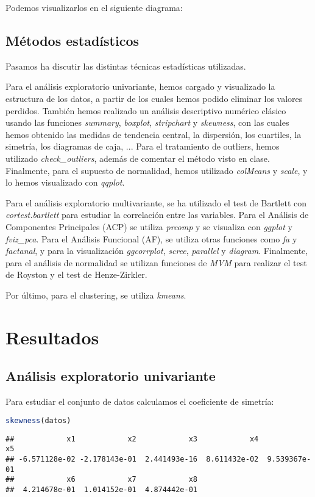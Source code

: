 \documentclass[11pt,a4paper]{article}
\begin{document}
Podemos visualizarlos en el siguiente diagrama:
\begin{figure}[H]
\centering
{}
\end{figure}

\subsection{Métodos estadísticos}
Pasamos ha discutir las distintas técnicas estadísticas utilizadas.

Para el análisis exploratorio univariante, hemos cargado y visualizado la estructura de los datos, a partir de los cuales hemos podido eliminar los valores perdidos. También hemos realizado un análisis descriptivo numérico clásico usando las funciones \emph{summary}, \emph{boxplot}, \emph{stripchart} y \emph{skewness}, con las cuales hemos obtenido las medidas de tendencia central, la dispersión, los cuartiles, la simetría, los diagramas de caja, ... Para el tratamiento de outliers, hemos utilizado \emph{check\_outliers}, además de comentar el método visto en clase. Finalmente, para el supuesto de normalidad, hemos utilizado \emph{colMeans} y \emph{scale}, y lo hemos visualizado con \emph{qqplot}.

Para el análisis exploratorio multivariante, se ha utilizado el test de Bartlett con \emph{cortest.bartlett} para estudiar la correlación entre las variables. Para el Análisis de Componentes Principales (ACP) se utiliza \emph{prcomp} y se visualiza con \emph{ggplot} y \emph{fviz\_pca}. Para el Análisis Funcional (AF), se utiliza otras funciones como \emph{fa} y \emph{factanal}, y para la visualización \emph{ggcorrplot}, \emph{scree}, \emph{parallel} y \emph{diagram}. Finalmente, para el análisis de normalidad se utilizan funciones de \emph{MVM} para realizar el test de Royston y el test de Henze-Zirkler.

Por último, para el clustering, se utiliza \emph{kmeans}.

\section{Resultados}
\subsection{Análisis exploratorio univariante}
Para estudiar el conjunto de datos calculamos el coeficiente de simetría:
\begin{lstlisting}[language=R]
skewness(datos)
\end{lstlisting}
\begin{verbatim}
##            x1            x2            x3            x4            x5 
## -6.571128e-02 -2.178143e-01  2.441493e-16  8.611432e-02  9.539367e-01 
##            x6            x7            x8 
##  4.214678e-01  1.014152e-01  4.874442e-01
\end{verbatim}
\end{document}
